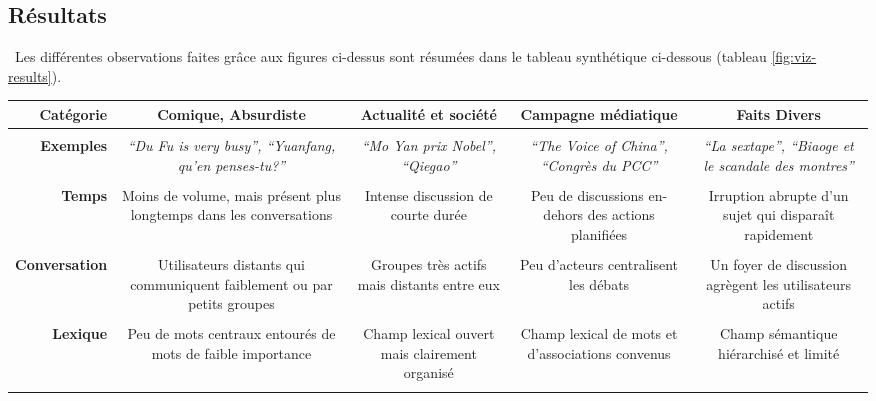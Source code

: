 \subsection[Résumé des résultats]{Résultats}
\
Les différentes observations faites grâce aux figures ci-dessus sont résumées dans le tableau synthétique ci-dessous (tableau \ref{fig:viz-results}).

{\small
\begin{table}[h!]
    \begin{tabulary}{\linewidth}{ r | C C C C}
        \textbf{Catégorie} & 
        \textbf{Comique, Absurdiste} &
        \textbf{Actualité et société}  &
        \textbf{Campagne médiatique} &
        \textbf{Faits Divers}  \\
        \hline \\[-1.2ex]

        \textbf{Exemples} & 
        \textit{``Du Fu is very busy'', ``Yuanfang, qu'en penses-tu?''} &
        \textit{``Mo Yan prix Nobel'', ``Qiegao''} &
        \textit{``The Voice of China'', ``Congrès du PCC''} &
        \textit{``La sextape'', ``Biaoge et le scandale des montres''} \\
        \hline \\[-1.2ex]

        \textbf{Temps} & 
        Moins de volume, mais présent  plus longtemps dans les conversations &
        Intense discussion de courte durée &
        Peu de discussions en-dehors des actions planifiées &
        Irruption abrupte d'un sujet qui disparaît rapidement \\
        \hline \\[-1.2ex]

        \textbf{Conversation} &  
        Utilisateurs distants qui communiquent faiblement ou par petits groupes &
        Groupes très actifs mais distants entre eux  &
        Peu d{\textquoteright}acteurs centralisent les débats &
        Un foyer de discussion agrègent les utilisateurs actifs \\
        \hline \\[-1.2ex]

        \textbf{Lexique} &
        Peu de mots centraux entourés de mots de faible importance &
        Champ lexical ouvert mais clairement organisé &
        Champ lexical de mots et d'associations convenus  &
        Champ sémantique hiérarchisé et limité \\
        \hline \\[-1.2ex]


\end{tabulary}
\end{table}}
